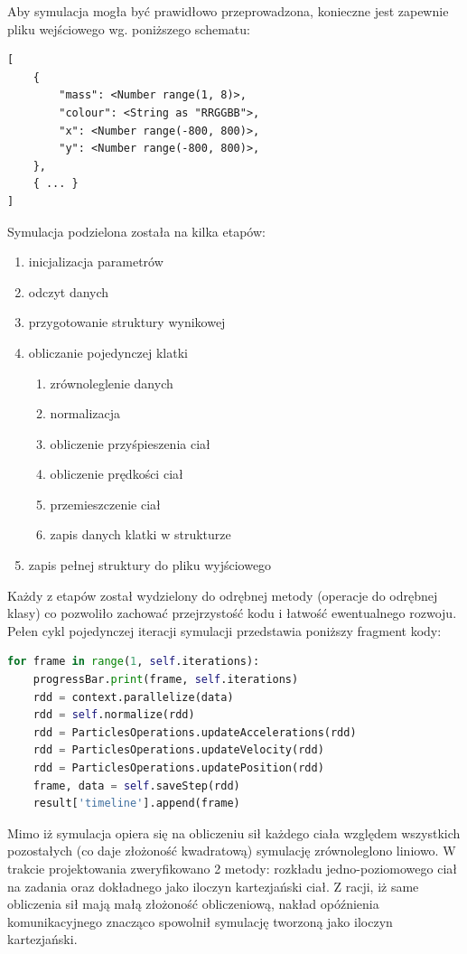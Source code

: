 \documentclass[a4paper,onecolumn,oneside,12pt]{memoir}
\begin{document}
{Aby symulacja mogła być prawidłowo przeprowadzona, konieczne jest zapewnie pliku wejściowego
wg. poniższego schematu:

\begin{lstlisting}[caption=Plik wejściowy symulacji]
[
    {
        "mass": <Number range(1, 8)>,
        "colour": <String as "RRGGBB">,
        "x": <Number range(-800, 800)>,
        "y": <Number range(-800, 800)>,
    },
    { ... }
]
\end{lstlisting}

Symulacja podzielona została na kilka etapów:
\begin{enumerate}
\item inicjalizacja parametrów
\item odczyt danych
\item przygotowanie struktury wynikowej
\item obliczanie pojedynczej klatki
	\begin{enumerate}
	\item zrównoleglenie danych
	\item normalizacja
	\item obliczenie przyśpieszenia ciał
	\item obliczenie prędkości ciał
	\item przemieszczenie ciał
	\item zapis danych klatki w strukturze
	\end{enumerate}
\item zapis pełnej struktury do pliku wyjściowego
\end{enumerate}

Każdy z etapów został wydzielony do odrębnej metody (operacje do odrębnej klasy) co
pozwoliło zachować przejrzystość kodu i łatwość ewentualnego rozwoju. Pełen cykl
pojedynczej iteracji symulacji przedstawia poniższy fragment kody:

\begin{lstlisting}[language=Python, caption=Plik wejściowy symulacji]
for frame in range(1, self.iterations):
	progressBar.print(frame, self.iterations)
	rdd = context.parallelize(data)
	rdd = self.normalize(rdd)
	rdd = ParticlesOperations.updateAccelerations(rdd)
	rdd = ParticlesOperations.updateVelocity(rdd)
	rdd = ParticlesOperations.updatePosition(rdd)
	frame, data = self.saveStep(rdd)
	result['timeline'].append(frame)
\end{lstlisting}

Mimo iż symulacja opiera się na obliczeniu sił każdego ciała względem wszystkich pozostałych
(co daje złożoność kwadratową) symulację zrównoleglono liniowo. W trakcie projektowania
zweryfikowano 2 metody: rozkładu jedno-poziomowego ciał na zadania oraz dokładnego jako
iloczyn kartezjański ciał. Z racji, iż same obliczenia sił mają małą złożoność obliczeniową,
nakład opóźnienia komunikacyjnego znacząco spowolnił symulację tworzoną jako iloczyn kartezjański.

}
\end{document}
